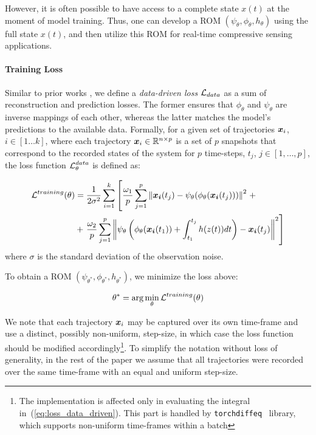 However, it is often possible to have access to a complete state $x(t)$ at the moment of model training. Thus, one can develop a ROM $(\psi_\theta, \phi_\theta, h_\theta)$ using the full state $x(t)$, and then utilize this ROM for real-time compressive sensing applications. 

\paragraph{Training Loss} Similar to prior works \cite{takeishi2017learning,morton2019deep,gin2021deep}, we define a \textit{data-driven loss} $\operatorname{\mathcal{L}}_{data}$ as a sum of reconstruction and prediction losses. The former ensures that $\phi_\theta$ and $\psi_\theta$ are inverse mappings of each other, whereas the latter matches the model's predictions to the available data. Formally, for a given set of trajectories $\boldsymbol{x}_i$, $i \in [1 \dots k]$, where each trajectory $\boldsymbol{x}_i \in \mathbb{R}^{n \times p}$ is a set of $p$ snapshots that correspond to the recorded states of the system for $p$ time-steps, $t_j$, $j \in [1, \dots, p]$, the loss function $\operatorname{\mathcal{L}}^{data}_\theta$ is defined as:

\begin{align}
    \label{eq:loss_training}
    \operatorname{\mathcal{L}}^{training}(\theta) & = \frac{1}{2\sigma^2}\sum_{i = 1}^k \left[\frac{\omega_1}{p}\sum_{j=1}^p\left\|\boldsymbol{x_i}(t_j) - \psi_\theta(\phi_\theta(\boldsymbol{x_i}(t_j)))\right\|^2\right. + \\
     & + \left.\frac{\omega_2}{p}\sum_{j=1}^p \left\|\psi_\theta\left(\phi_\theta(\boldsymbol{x_i}(t_1)) + \int_{t_1}^{t_j}h(z(t))dt\right) - \boldsymbol{x_i}(t_j)\right\|^2 \right]
\end{align}
where $\sigma$ is the standard deviation of the observation noise.

To obtain a ROM $(\psi_{\theta^*}, \phi_{\theta^*}, h_{\theta^*})$, we minimize the loss above:

\begin{equation}
    \label{eq:training_minimization}
    \theta^* = \arg\min_{\theta} \operatorname{\mathcal{L}}^{training}(\theta)
\end{equation}

We note that each trajectory $\boldsymbol{x}_i$ may be captured over its own time-frame and use a distinct, possibly non-uniform, step-size, in which case the loss function should be modified accordingly\footnote{The implementation is affected only in evaluating the integral in~(\ref{eq:loss_data_driven}). This part is handled by \texttt{torchdiffeq}~\cite{chen2018neural} library, which supports non-uniform time-frames within a batch}. To simplify the notation without loss of generality, in the rest of the paper we assume that all trajectories were recorded over the same time-frame with an equal and uniform step-size. 

